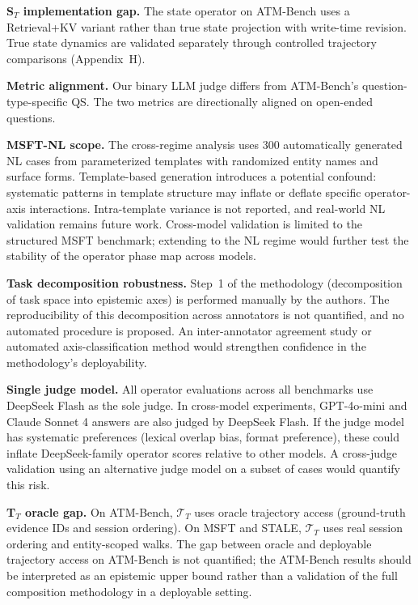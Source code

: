 \documentclass[letterpaper,twocolumn,10pt]{article}
\begin{document}
\textbf{S$_T$ implementation gap.} The state operator on ATM-Bench uses a Retrieval+KV variant rather than true state projection with write-time revision. True state dynamics are validated separately through controlled trajectory comparisons (Appendix~H).

\textbf{Metric alignment.} Our binary LLM judge differs from ATM-Bench's question-type-specific QS. The two metrics are directionally aligned on open-ended questions.

\textbf{MSFT-NL scope.} The cross-regime analysis uses 300 automatically generated NL cases from parameterized templates with randomized entity names and surface forms. Template-based generation introduces a potential confound: systematic patterns in template structure may inflate or deflate specific operator-axis interactions. Intra-template variance is not reported, and real-world NL validation remains future work. Cross-model validation is limited to the structured MSFT benchmark; extending to the NL regime would further test the stability of the operator phase map across models.

\textbf{Task decomposition robustness.} Step~1 of the methodology (decomposition of task space into epistemic axes) is performed manually by the authors. The reproducibility of this decomposition across annotators is not quantified, and no automated procedure is proposed. An inter-annotator agreement study or automated axis-classification method would strengthen confidence in the methodology's deployability.

\textbf{Single judge model.} All operator evaluations across all benchmarks use DeepSeek Flash as the sole judge. In cross-model experiments, GPT-4o-mini and Claude Sonnet 4 answers are also judged by DeepSeek Flash. If the judge model has systematic preferences (lexical overlap bias, format preference), these could inflate DeepSeek-family operator scores relative to other models. A cross-judge validation using an alternative judge model on a subset of cases would quantify this risk.

\textbf{T$_T$ oracle gap.} On ATM-Bench, $\mathcal{T}_T$ uses oracle trajectory access (ground-truth evidence IDs and session ordering). On MSFT and STALE, $\mathcal{T}_T$ uses real session ordering and entity-scoped walks. The gap between oracle and deployable trajectory access on ATM-Bench is not quantified; the ATM-Bench results should be interpreted as an epistemic upper bound rather than a validation of the full composition methodology in a deployable setting.
\end{document}
